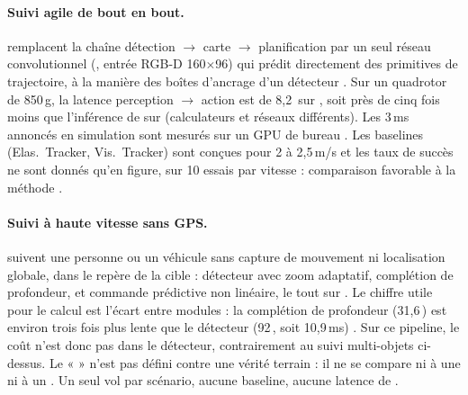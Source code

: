 \paragraph{Suivi agile de bout en bout.} \citet{arxiv-2505.06923-yopov2-tracker-end-end-agile}\pp{}
remplacent la chaîne détection $\rightarrow$ carte $\rightarrow$ planification par un seul
réseau convolutionnel (, entrée RGB-D 160$\times$96) qui prédit directement des
primitives de trajectoire, à la manière des boîtes d'ancrage d'un détecteur .
Sur un quadrotor de 850\,g, la latence perception $\rightarrow$ action est de 8,2\, sur
 , soit près de cinq fois moins que l'inférence de
\citet{arxiv-2110.05113-learning-high-speed-flight-wild} sur  \deduit{} (calculateurs et
réseaux différents). Les 3\,ms annoncés en simulation sont mesurés sur un GPU de bureau 
. Les baselines (Elas.~Tracker, Vis.~Tracker) sont conçues pour
2 à 2,5\,m/s et les taux de succès ne sont donnés qu'en figure, sur 10 essais par vitesse :
comparaison favorable à la méthode \deduit.

\paragraph{Suivi à haute vitesse sans GPS.} \citet{arxiv-2506.18689-nova-navigation-object-centric-visual}\pp{}
suivent une personne ou un véhicule sans capture de mouvement ni localisation globale, dans
le repère de la cible : détecteur  avec zoom adaptatif, complétion de profondeur,
 et commande prédictive non linéaire, le tout sur 
. Le chiffre utile pour le calcul est l'écart entre modules : la complétion de
profondeur (31,6\,) est environ trois fois plus lente que le détecteur
(92\,, soit 10,9\,ms) \deduit. Sur ce pipeline, le coût n'est donc pas dans le détecteur,
contrairement au suivi multi-objets ci-dessus. Le «  » n'est pas défini
contre une vérité terrain : il ne se compare ni à une  ni à un . Un seul vol par
scénario, aucune baseline, aucune latence de .


